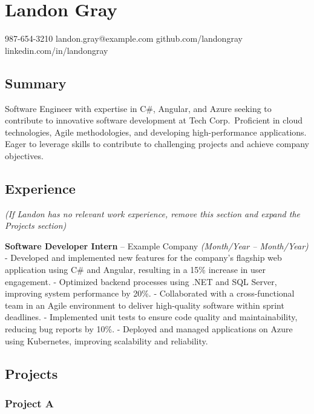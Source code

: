 \documentclass[
]{article}
\author{}
\date{}
\begin{document}
\section{Landon Gray}\label{landon-gray}

987-654-3210 \textbar{} landon.gray@example.com \textbar{}
github.com/landongray \textbar{} linkedin.com/in/landongray

\subsection{\texorpdfstring{\textbf{Summary}}{Summary}}\label{summary}

Software Engineer with expertise in C\#, Angular, and Azure seeking to
contribute to innovative software development at Tech Corp.~Proficient
in cloud technologies, Agile methodologies, and developing
high-performance applications. Eager to leverage skills to contribute to
challenging projects and achieve company objectives.

\subsection{\texorpdfstring{\textbf{Experience}}{Experience}}\label{experience}

\emph{(If Landon has no relevant work experience, remove this section
and expand the Projects section)}

\textbf{Software Developer Intern} -- Example Company \emph{(Month/Year
-- Month/Year)} - Developed and implemented new features for the
company's flagship web application using C\# and Angular, resulting in a
15\% increase in user engagement. - Optimized backend processes using
.NET and SQL Server, improving system performance by 20\%. -
Collaborated with a cross-functional team in an Agile environment to
deliver high-quality software within sprint deadlines. - Implemented
unit tests to ensure code quality and maintainability, reducing bug
reports by 10\%. - Deployed and managed applications on Azure using
Kubernetes, improving scalability and reliability.

\subsection{\texorpdfstring{\textbf{Projects}}{Projects}}\label{projects}

\subsubsection{\texorpdfstring{\textbf{Project
A}}{Project A}}\label{project-a}
\end{document}
